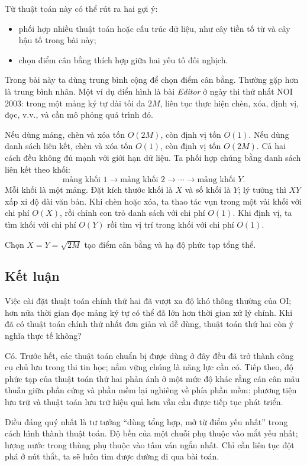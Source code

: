 \documentclass[11pt]{article}
\begin{document}
Từ thuật toán này có thể rút ra hai gợi ý:
\begin{itemize}
  \item phối hợp nhiều thuật toán hoặc cấu trúc dữ liệu, như cây tiền tố từ và
  cây hậu tố trong bài này;
  \item chọn điểm cân bằng thích hợp giữa hai yếu tố đối nghịch.
\end{itemize}

Trong bài này ta dùng trung bình cộng để chọn điểm cân bằng. Thường gặp hơn là
trung bình nhân. Một ví dụ điển hình là bài \emph{Editor} ở ngày thi thứ nhất
NOI 2003: trong một mảng ký tự dài tối đa $2M$, liên tục thực hiện chèn, xóa,
định vị, đọc, v.v., và cần mô phỏng quá trình đó.

Nếu dùng mảng, chèn và xóa tốn $O(2M)$, còn định vị tốn $O(1)$. Nếu dùng danh
sách liên kết, chèn và xóa tốn $O(1)$, còn định vị tốn $O(2M)$. Cả hai cách
đều không đủ mạnh với giới hạn dữ liệu. Ta phối hợp chúng bằng danh sách liên
kết theo khối:
\[
\boxed{\text{mảng khối 1}}\to
\boxed{\text{mảng khối 2}}\to
\cdots\to
\boxed{\text{mảng khối }Y}.
\]
Mỗi khối là một mảng. Đặt kích thước khối là $X$ và số khối là $Y$; lý tưởng
thì $XY$ xấp xỉ độ dài văn bản. Khi chèn hoặc xóa, ta thao tác vụn trong một
vài khối với chi phí $O(X)$, rồi chỉnh con trỏ danh sách với chi phí $O(1)$.
Khi định vị, ta tìm khối với chi phí $O(Y)$ rồi tìm vị trí trong khối với chi
phí $O(1)$.

Chọn $X=Y=\sqrt{2M}$ tạo điểm cân bằng và hạ độ phức tạp tổng thể.

\subsection{Kết luận}

Việc cài đặt thuật toán chính thứ hai đã vượt xa độ khó thông thường của OI;
hơn nữa thời gian đọc mảng ký tự có thể đã lớn hơn thời gian xử lý chính. Khi
đã có thuật toán chính thứ nhất đơn giản và dễ dùng, thuật toán thứ hai còn ý
nghĩa thực tế không?

Có. Trước hết, các thuật toán chuẩn bị được dùng ở đây đều đã trở thành công
cụ chủ lưu trong thi tin học; nắm vững chúng là năng lực cần có. Tiếp theo,
độ phức tạp của thuật toán thứ hai phản ánh ở một mức độ khác rằng cán cân
mâu thuẫn giữa phần cứng và phần mềm lại nghiêng về phía phần mềm: phương
tiện lưu trữ và thuật toán lưu trữ hiệu quả hơn vẫn cần được tiếp tục phát
triển.

Điều đáng quý nhất là tư tưởng ``dùng tổng hợp, mở từ điểm yếu nhất'' trong
cách hình thành thuật toán. Độ bền của một chuỗi phụ thuộc vào mắt yếu nhất;
lượng nước trong thùng phụ thuộc vào tấm ván ngắn nhất. Chỉ cần liên tục đột
phá ở nút thắt, ta sẽ luôn tìm được đường đi qua bài toán.
\end{document}
